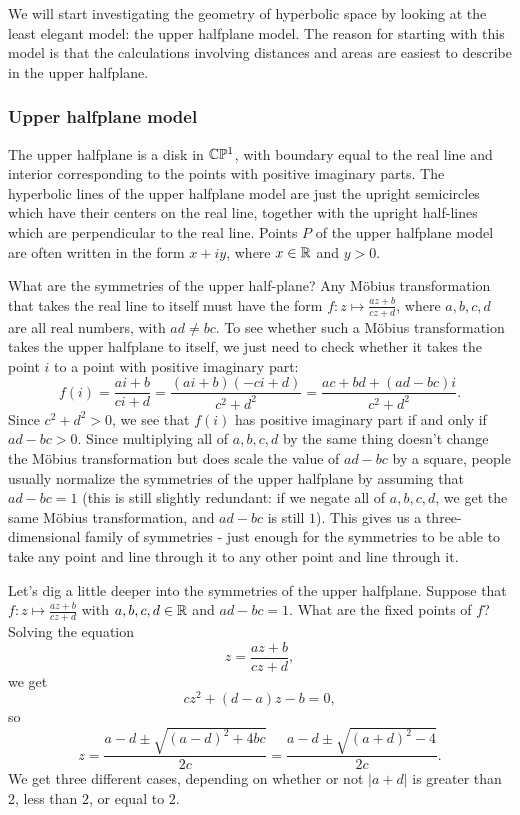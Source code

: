 We will start investigating the geometry of hyperbolic space by looking at the least elegant model: the upper halfplane model. The reason for starting with this model is that the calculations involving distances and areas are easiest to describe in the upper halfplane.


\subsubsection{Upper halfplane model}

The upper halfplane is a disk in $\mathbb{C}\mathbb{P}^1$, with boundary equal to the real line and interior corresponding to the points with positive imaginary parts. The hyperbolic lines of the upper halfplane model are just the upright semicircles which have their centers on the real line, together with the upright half-lines which are perpendicular to the real line. Points $P$ of the upper halfplane model are often written in the form $x + iy$, where $x \in \mathbb{R}$ and $y > 0$.

What are the symmetries of the upper half-plane? Any M\"obius transformation that takes the real line to itself must have the form $f : z \mapsto \frac{az + b}{cz + d}$, where $a,b,c,d$ are all real numbers, with $ad \ne bc$. To see whether such a M\"obius transformation takes the upper halfplane to itself, we just need to check whether it takes the point $i$ to a point with positive imaginary part:
\[
f(i) = \frac{ai+b}{ci+d} = \frac{(ai+b)(-ci+d)}{c^2+d^2} = \frac{ac+bd + (ad - bc)i}{c^2 + d^2}.
\]
Since $c^2 + d^2 > 0$, we see that $f(i)$ has positive imaginary part if and only if $ad - bc > 0$. Since multiplying all of $a,b,c,d$ by the same thing doesn't change the M\"obius transformation but does scale the value of $ad - bc$ by a square, people usually normalize the symmetries of the upper halfplane by assuming that $ad - bc = 1$ (this is still slightly redundant: if we negate all of $a,b,c,d$, we get the same M\"obius transformation, and $ad - bc$ is still $1$). This gives us a three-dimensional family of symmetries - just enough for the symmetries to be able to take any point and line through it to any other point and line through it.

Let's dig a little deeper into the symmetries of the upper halfplane. Suppose that $f : z \mapsto \frac{az + b}{cz + d}$ with $a,b,c,d \in \mathbb{R}$ and $ad - bc = 1$. What are the fixed points of $f$? Solving the equation
\[
z = \frac{az+b}{cz+d},
\]
we get
\[
cz^2 + (d-a)z - b = 0,
\]
so
\[
z = \frac{a-d \pm \sqrt{(a-d)^2 + 4bc}}{2c} = \frac{a-d \pm \sqrt{(a+d)^2 - 4}}{2c}.
\]
We get three different cases, depending on whether or not $|a+d|$ is greater than $2$, less than $2$, or equal to $2$.

